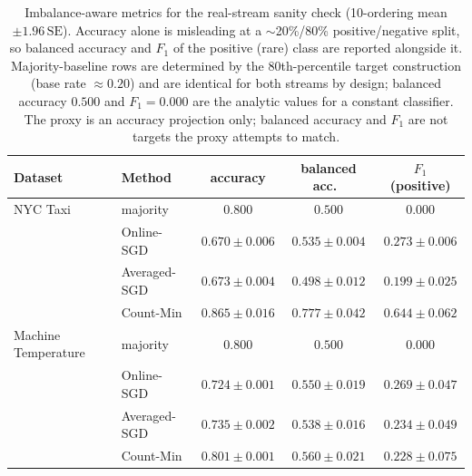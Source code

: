 \documentclass[sensors,article,submit,pdftex,moreauthors]{Definitions/mdpi}
\begin{document}
\begin{table}[t]
\centering
\caption{Imbalance-aware metrics for the real-stream sanity check (10-ordering mean $\pm 1.96\,\mathrm{SE}$). Accuracy alone is misleading at a $\sim$20\%/80\% positive/negative split, so balanced accuracy and $F_1$ of the positive (rare) class are reported alongside it. Majority-baseline rows are determined by the 80th-percentile target construction (base rate $\approx 0.20$) and are identical for both streams by design; balanced accuracy $0.500$ and $F_1 = 0.000$ are the analytic values for a constant classifier. The proxy is an accuracy projection only; balanced accuracy and $F_1$ are not targets the proxy attempts to match.}
\label{tab:real_stream_metrics}
\small
\begin{tabular}{@{}llccc@{}}
\toprule
Dataset & Method & accuracy & balanced acc.\ & $F_1$ (positive) \\
\midrule
NYC Taxi              & majority           & $0.800$ & $0.500$ & $0.000$ \\
                      & Online-SGD         & $0.670 \pm 0.006$ & $0.535 \pm 0.004$ & $0.273 \pm 0.006$ \\
                      & Averaged-SGD       & $0.673 \pm 0.004$ & $0.498 \pm 0.012$ & $0.199 \pm 0.025$ \\
                      & Count-Min          & $0.865 \pm 0.016$ & $0.777 \pm 0.042$ & $0.644 \pm 0.062$ \\
\midrule
Machine Temperature   & majority           & $0.800$ & $0.500$ & $0.000$ \\
                      & Online-SGD         & $0.724 \pm 0.001$ & $0.550 \pm 0.019$ & $0.269 \pm 0.047$ \\
                      & Averaged-SGD       & $0.735 \pm 0.002$ & $0.538 \pm 0.016$ & $0.234 \pm 0.049$ \\
                      & Count-Min          & $0.801 \pm 0.001$ & $0.560 \pm 0.021$ & $0.228 \pm 0.075$ \\
\bottomrule
\end{tabular}
\end{table}
\end{document}
